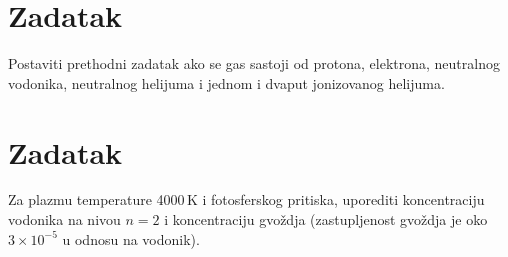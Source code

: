 \documentclass[12pt]{article}
\begin{document}
\section{Zadatak}
Postaviti prethodni zadatak ako se gas sastoji od protona, elektrona, neutralnog vodonika, neutralnog helijuma i jednom i dvaput jonizovanog helijuma. 

\section{Zadatak}
Za plazmu temperature 4000\,K i fotosferskog pritiska, uporediti koncentraciju vodonika na nivou $n=2$ i koncentraciju gvo\v{z}dja (zastupljenost gvo\v{z}dja je oko $3\times 10^{-5}$ u odnosu na vodonik).
\end{document}
